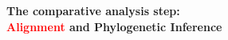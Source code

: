 \documentclass[landscape]{slides}
\begin{document}
\begin{slide}
\begin{center}

\textbf{The comparative analysis step: \\ \textcolor{red}{Alignment} and Phylogenetic Inference}
\end{center}

\vfill
\end{slide}
\end{document}
